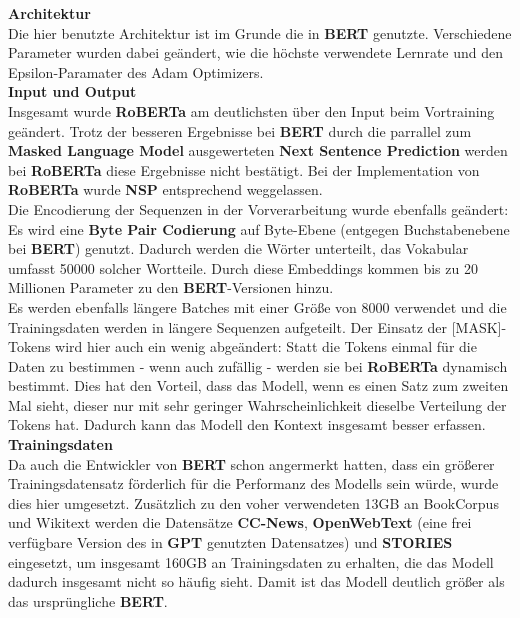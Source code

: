 \textbf{Architektur}\\
Die hier benutzte Architektur ist im Grunde die in \textbf{BERT} genutzte. Verschiedene Parameter wurden dabei ge\"andert, wie die h\"ochste verwendete Lernrate und den Epsilon-Paramater des Adam Optimizers.\\

\textbf{Input und Output}\\
Insgesamt wurde \textbf{RoBERTa} am deutlichsten \"uber den Input beim Vortraining ge\"andert. Trotz der besseren Ergebnisse bei \textbf{BERT} durch die parrallel zum \textbf{Masked Language Model} ausgewerteten \textbf{Next Sentence Prediction} werden bei \textbf{RoBERTa} diese Ergebnisse nicht best\"atigt. Bei der Implementation von \textbf{RoBERTa} wurde \textbf{NSP} entsprechend weggelassen.\\
Die Encodierung der Sequenzen in der Vorverarbeitung wurde ebenfalls ge\"andert: Es wird eine \textbf{Byte Pair Codierung} auf Byte-Ebene (entgegen Buchstabenebene bei \textbf{BERT}) genutzt. Dadurch werden die W\"orter unterteilt, das Vokabular umfasst 50000 solcher Wortteile. Durch diese Embeddings kommen bis zu 20 Millionen Parameter zu den \textbf{BERT}-Versionen hinzu.\\
Es werden ebenfalls l\"angere Batches mit einer Gr\"o{\ss}e von 8000 verwendet und die Trainingsdaten werden in l\"angere Sequenzen aufgeteilt. Der Einsatz der [MASK]-Tokens wird hier auch ein wenig abge\"andert: Statt die Tokens einmal f\"ur die Daten zu bestimmen - wenn auch zuf\"allig - werden sie bei \textbf{RoBERTa} dynamisch bestimmt. Dies hat den Vorteil, dass das Modell, wenn es einen Satz zum zweiten Mal sieht, dieser nur mit sehr geringer Wahrscheinlichkeit dieselbe Verteilung der Tokens hat. Dadurch kann das Modell den Kontext insgesamt besser erfassen.\\

\textbf{Trainingsdaten}\\
Da auch die Entwickler von \textbf{BERT} schon angermerkt hatten, dass ein gr\"o{\ss}erer Trainingsdatensatz f\"orderlich f\"ur die Performanz des Modells sein w\"urde, wurde dies hier umgesetzt. Zus\"atzlich zu den voher verwendeten 13GB an BookCorpus und Wikitext werden die Datens\"atze \textbf{CC-News}, \textbf{OpenWebText} (eine frei verf\"ugbare Version des in \textbf{GPT} genutzten Datensatzes) und \textbf{STORIES} eingesetzt, um insgesamt 160GB an Trainingsdaten zu erhalten, die das Modell dadurch insgesamt nicht so h\"aufig sieht. Damit ist das Modell deutlich gr\"o{\ss}er als das urspr\"ungliche \textbf{BERT}.


